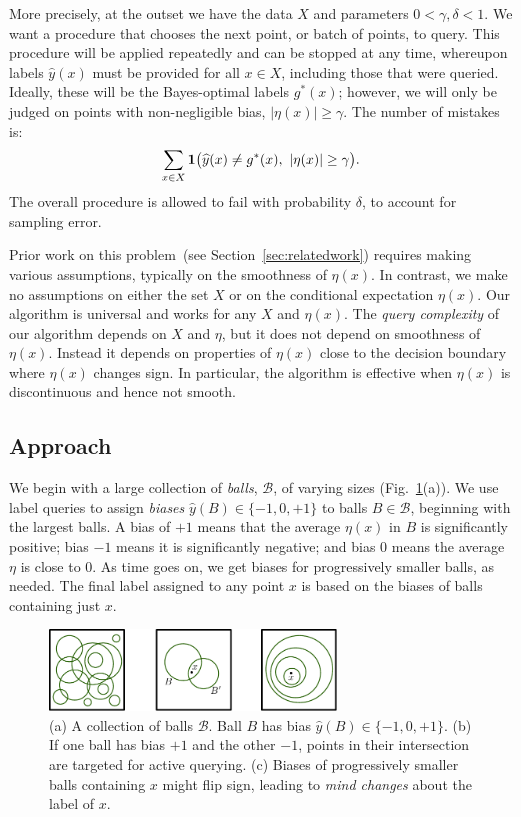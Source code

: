 \documentclass[twoside]{article}
\def\B{{\mathcal B}}
\def\yh{{\widehat{y}}}
\begin{document}
More precisely, at the outset we have the data $X$ and parameters
$0 < \gamma, \delta < 1$. We want a procedure that chooses the next
point, or batch of points, to query. This procedure will be applied
repeatedly and can be stopped at any time, whereupon labels $\yh(x)$
must be provided for all $x \in X$, including those that were
queried. Ideally, these will be the Bayes-optimal labels $g^*(x)$;
however, we will only be judged on points with non-negligible bias,
$|\eta(x)| \geq \gamma$. The number of mistakes is:
$$ \sum_{x \in X} {\bf 1} \big(\yh(x) \neq g^*(x),\ |\eta(x)| \geq \gamma \big) .$$
The overall procedure is allowed to fail with probability $\delta$, to account for sampling error.


Prior work on this problem~(see Section~\ref{sec:relatedwork})
requires making various assumptions, typically on the smoothness of
$\eta(x)$.  In contrast, we make no assumptions on either the set $X$
or on the conditional expectation $\eta(x)$. Our algorithm is
universal and works for any $X$ and $\eta(x)$. The {\em query
  complexity} of our algorithm depends on $X$ and $\eta$, but it does
not depend on smoothness of $\eta(x)$. Instead it depends on
properties of $\eta(x)$ close to the decision boundary where $\eta(x)$
changes sign. In particular, the algorithm is effective when $\eta(x)$
is discontinuous and hence not smooth.

\subsection{Approach}

We begin with a large collection of \emph{balls}, $\B$, of varying
sizes (Fig.~\ref{fig:challenges}(a)). We use label queries to assign
\emph{biases} $\yh(B) \in \{-1,0,+1\}$ to balls $B \in \B$, beginning
with the largest balls. A bias of $+1$ means that the average
$\eta(x)$ in $B$ is significantly positive; bias $-1$ means it is
significantly negative; and bias $0$ means the average $\eta$ is close
to 0. As time goes on, we get biases for progressively smaller balls,
as needed. The final label assigned to any point $x$ is based on the
biases of balls containing just $x$.

\begin{figure}
\begin{center}
\includegraphics[width=3in]{figures/ideas.pdf}
\end{center}
\caption{(a) A collection of balls $\B$. Ball $B$ has bias $\yh(B) \in \{-1,0,+1\}$. (b) If one ball has bias $+1$ and the other $-1$, points in their intersection are targeted for active querying. (c) Biases of progressively smaller balls containing $x$ might flip sign, leading to \emph{mind changes} about the label of $x$.}
\label{fig:challenges}
\end{figure}
\end{document}
